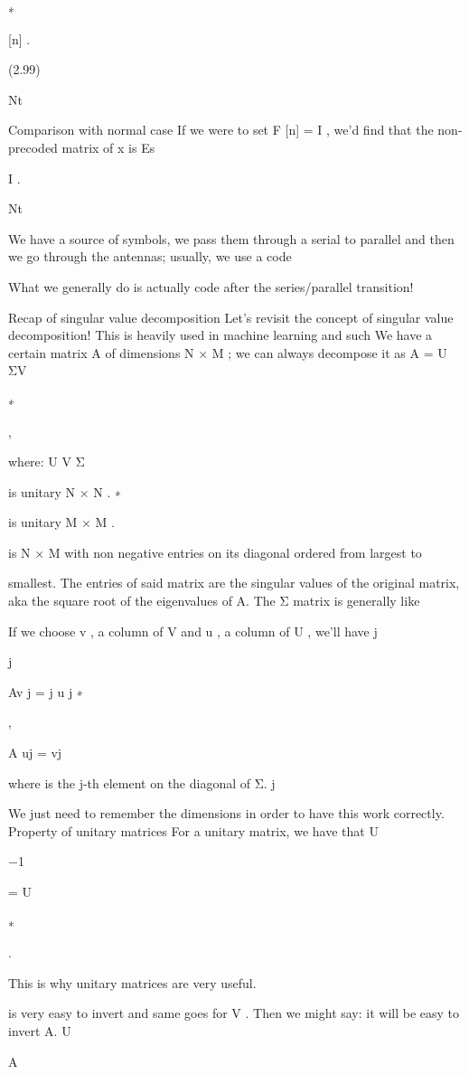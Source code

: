 {∗

[n] .

(2.99)

Nt

​Comparison with normal case If we were to set F [n] = I , we'd find that the non-precoded matrix of x is Es

I .

Nt

We have a source of symbols, we pass them through a serial to parallel and then we go through the antennas; usually, we use a code

What we generally do is actually code after the series/parallel transition!

Recap of singular value decomposition Let's revisit the concept of singular value decomposition!
This is heavily used in machine learning and such We have a certain matrix A of dimensions N × M ; we can always decompose it as A = U ΣV

∗

,

where:
U V Σ

is unitary N × N .
∗

is unitary M × M .

is N × M with non negative entries on its diagonal ordered from largest to

smallest.
The entries of said matrix are the singular values of the original matrix, aka the square root of the eigenvalues of A.
The Σ matrix is generally like

If we choose v , a column of V and u , a column of U , we'll have j

j

Av j = \sigma j u j
∗

,

A uj = \sigmaj vj

where \sigma is the j-th element on the diagonal of Σ.
j

We just need to remember the dimensions in order to have this work correctly.
Property of unitary matrices For a unitary matrix, we have that U

−1

= U

∗

.

This is why unitary matrices are very useful.

is very easy to invert and same goes for V . Then we might say: it will be easy to invert A.
U

A

}
